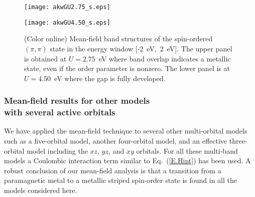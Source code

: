 \documentclass[aps,prb,superscriptaddress,preprintnumbers,
showpacs,legalpaper,twoside,twocolumn,amsmath,amssymb]{revtex4}
\begin{document}
\begin{figure}[h]
\begin{center}
\centerline{\texttt{[image: akwGU2.75\_s.eps]}}
\centerline{\texttt{[image: akwGU4.50\_s.eps]}}
%
\caption{(Color online) Mean-field band structures of the spin-ordered
$(\pi,\pi)$ state in the
energy window [-2~eV,~2~eV]. The upper panel is obtained
at $U=2.75$~eV where band overlap indicates a metallic state, even if the
order parameter is nonzero.  The lower panel is at
$U=4.50$~eV where the gap is fully developed.}
\vskip -0.9cm
\label{F.BandG}
\end{center}
\end{figure}



\subsubsection{Mean-field results for other models \\
with several active orbitals}


We have applied the mean-field technique to several other
multi-orbital models such as a five-orbital model,\cite{kuroki} another
four-orbital model,\cite{korshunov} and an effective
three-orbital model including the $xz$, $yz$, and $xy$ orbitals.\cite{plee}  For all
these multi-band models a Coulombic interaction term similar to
Eq.~(\ref{E.Hint}) has been used. A robust conclusion of our mean-field analysis is that a
transition from a paramagnetic metal to a metallic striped
spin-order state is found in all the models considered here.
\end{document}
